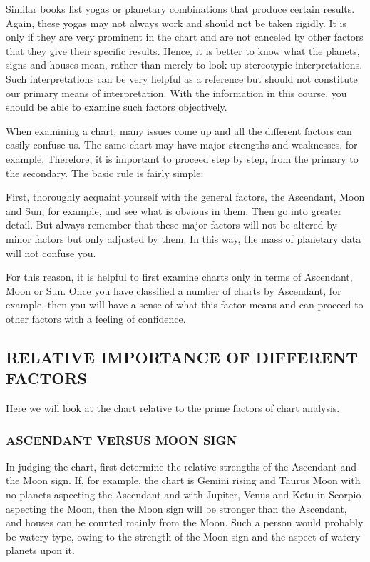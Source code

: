 

Similar books list yogas or planetary combinations that produce certain results. Again, these yogas may not always work and should not be taken rigidly. It is only if they are very prominent in the chart and are not canceled by other factors that they give their specific results. Hence, it is better to know what the planets, signs and houses mean, rather than merely to look up stereotypic interpretations. Such interpretations can be very helpful as a reference but should not constitute our primary means of interpretation. With the information in this course, you should be able to examine such factors objectively.

 

When examining a chart, many issues come up and all the different factors can easily confuse us. The same chart may have major strengths and weaknesses, for example. Therefore, it is important to proceed step by step, from the primary to the secondary. The basic rule is fairly simple:

 

First, thoroughly acquaint yourself with the general factors, the Ascendant, Moon and Sun, for example, and see what is obvious in them.
Then go into greater detail. But always remember that these major factors will not be altered by minor factors but only adjusted by them. In this way, the mass of planetary data will not confuse you.
 

For this reason, it is helpful to first examine charts only in terms of Ascendant, Moon or Sun. Once you have classified a number of charts by Ascendant, for example, then you will have a sense of what this factor means and can proceed to other factors with a feeling of confidence.

 

\subsection{RELATIVE IMPORTANCE OF DIFFERENT FACTORS}
Here we will look at the chart relative to the prime factors of chart analysis.

\subsubsection{ASCENDANT VERSUS MOON SIGN}

 

In judging the chart, first determine the relative strengths of the Ascendant and the Moon sign. If, for example, the chart is Gemini rising and Taurus Moon with no planets aspecting the Ascendant and with Jupiter, Venus and Ketu in Scorpio aspecting the Moon, then the Moon sign will be stronger than the Ascendant, and houses can be counted mainly from the Moon. Such a person would probably be watery type, owing to the strength of the Moon sign and the aspect of watery planets upon it.

